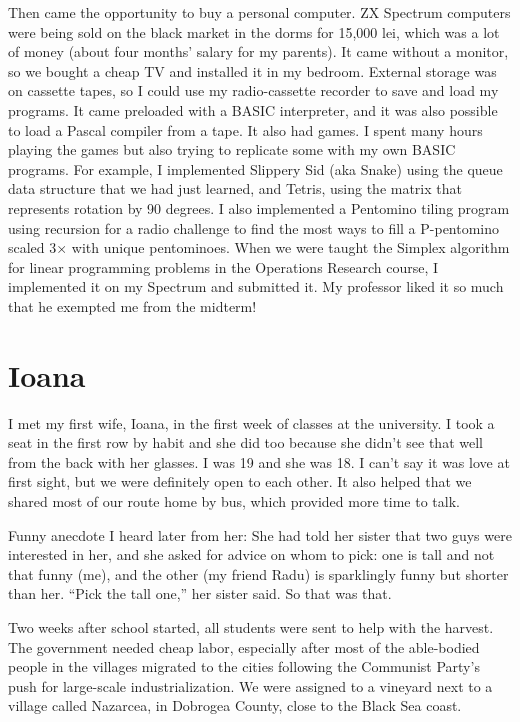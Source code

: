 \documentclass[12pt]{book}
\begin{document}
Then came the opportunity to buy a personal computer. ZX Spectrum
computers were being sold on the black market in the dorms for 15,000
lei, which was a lot of money (about four months' salary for my
parents). It came without a monitor, so we bought a cheap TV and
installed it in my bedroom. External storage was on cassette tapes, so I
could use my radio-cassette recorder to save and load my programs. It
came preloaded with a BASIC interpreter, and it was also possible to
load a Pascal compiler from a tape. It also had games. I spent many
hours playing the games but also trying to replicate some with my own
BASIC programs. For example, I implemented Slippery Sid (aka Snake)
using the queue data structure that we had just learned, and Tetris,
using the matrix that represents rotation by 90 degrees. I also
implemented a Pentomino tiling program using recursion for a radio
challenge to find the most ways to fill a P-pentomino scaled 3× with
unique pentominoes. When we were taught the Simplex algorithm for linear
programming problems in the Operations Research course, I implemented it
on my Spectrum and submitted it. My professor liked it so much that he
exempted me from the midterm!


\section{Ioana}

I met my first wife, Ioana, in the first week of classes at the
university. I took a seat in the first row by habit and she did too
because she didn't see that well from the back with her glasses. I was
19 and she was 18. I can't say it was love at first sight, but we were
definitely open to each other. It also helped that we shared most of our
route home by bus, which provided more time to talk.

Funny anecdote I heard later from her: She had told her sister that two
guys were interested in her, and she asked for advice on whom to pick:
one is tall and not that funny (me), and the other (my friend Radu) is
sparklingly funny but shorter than her. ``Pick the tall one,'' her
sister said. So that was that.

Two weeks after school started, all students were sent to help with the
harvest. The government needed cheap labor, especially after most of the
able-bodied people in the villages migrated to the cities following the
Communist Party's push for large-scale industrialization. We were
assigned to a vineyard next to a village called Nazarcea, in Dobrogea
County, close to the Black Sea coast.
\end{document}
